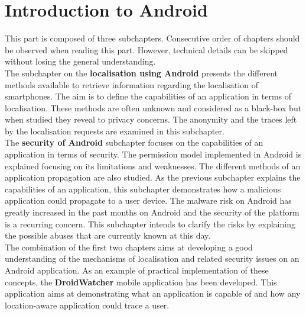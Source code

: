 \chapter{Introduction to Android}
\label{chap:andro-intro}


This part is composed of three subchapters.
Consecutive order of chapters should be observed when reading this part.
However, technical details can be skipped without losing the general understanding.\\

The subchapter on the \textbf{localisation using Android} presents the different methods available to retrieve information regarding the localisation of smartphones.
The aim is to define the capabilities of an application in terms of localisation.
These methods are often unknown and considered as a black-box but when studied they reveal to privacy concerns.
The anonymity and the traces left by the localisation requests are examined in this subchapter.\\

The \textbf{security of Android} subchapter focuses on the capabilities of an application in terms of security.
The permission model implemented in Android is explained focusing on its limitations and weaknesses.
The different methods of an application propagation are also studied.
As the previous subchapter explains the capabilities of an application, this subchapter demonstrates how a malicious application could propagate to a user device.
The malware risk on Android has greatly increased in the past months on Android and the security of the platform is a recurring concern.
This subchapter intends to clarify the risks by explaining the possible abuses that are currently known at this day.\\

The combination of the first two chapters aims at developing a good understanding of the mechanisms of localisation and related security issues on an Android application.
As an example of practical implementation of these concepts, the \textbf{DroidWatcher} mobile application has been developed.
This application aims at demonstrating what an application is capable of and how any location-aware application could trace a user.

